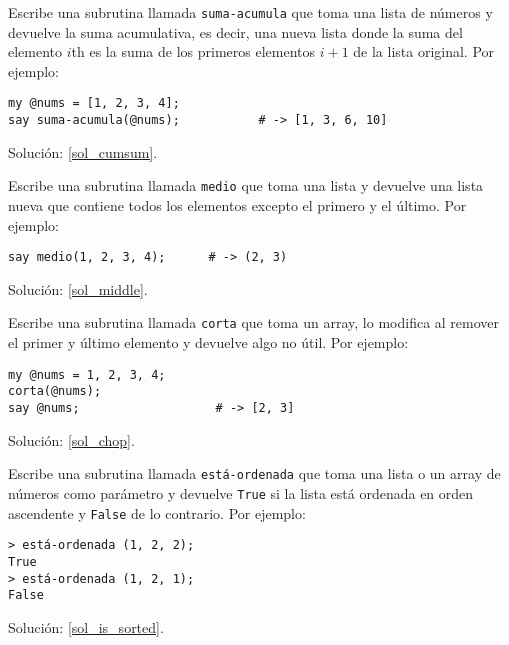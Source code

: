 \begin{exercise}
\label{cumulative}

Escribe una subrutina llamada \verb|suma-acumula| que toma una lista
de números y devuelve la suma acumulativa, es decir, una nueva lista
donde la suma del elemento $i$th es la suma de los primeros elementos
$i+1$ de la lista original. Por ejemplo:
\label{cumsum}

\begin{lstlisting}
my @nums = [1, 2, 3, 4];
say suma-acumula(@nums);           # -> [1, 3, 6, 10]
\end{lstlisting}

Solución: \ref{sol_cumsum}.

\end{exercise}

\begin{exercise}

Escribe una subrutina llamada \verb|medio| que toma una lista y devuelve
una lista nueva que contiene todos los elementos excepto el primero y el
último. Por ejemplo:
\label{middle}

\begin{lstlisting}
say medio(1, 2, 3, 4);      # -> (2, 3)
\end{lstlisting}

Solución: \ref{sol_middle}.

\end{exercise}

\begin{exercise}

Escribe una subrutina llamada \verb|corta| que toma un
array, lo modifica al remover el primer y último elemento y
devuelve algo no útil. Por ejemplo:
\label{chop}

\begin{lstlisting}
my @nums = 1, 2, 3, 4;
corta(@nums);
say @nums;                   # -> [2, 3]
\end{lstlisting}

Solución: \ref{sol_chop}.

\end{exercise}


\begin{exercise}
Escribe una subrutina llamada \verb|está-ordenada| que toma
una lista o un array de números como parámetro y devuelve {\tt True}
si la lista está ordenada en orden ascendente y {\tt False} 
de lo contrario. Por ejemplo:
\label{is_sorted}

\begin{lstlisting}
> está-ordenada (1, 2, 2);
True
> está-ordenada (1, 2, 1);
False
\end{lstlisting}

Solución: \ref{sol_is_sorted}.

\end{exercise}


